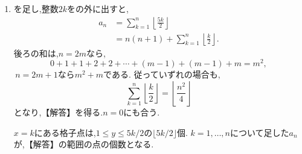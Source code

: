     \noindent {}\par\nobreak
    \begin{enumerate}[label=(\arabic*),parsep=3pt,beginpenalty=10000,format=\bookitemlink{example-gauss-role-10}{solution}{problem}]
      \item {}を足し,整数$2k$をの外に出すと,
            \begin{align*}
              a_n&=\sum_{k=1}^{n}\left\lfloor\frac{5k}{2}\right\rfloor\\
                 &=n(n+1)+\sum_{k=1}^{n}\left\lfloor\frac k2\right\rfloor.
            \end{align*}
            後ろの和は,$n=2m$なら,
            \[
              0+1+1+2+2+\cdots+(m-1)+(m-1)+m=m^2,
            \]
            \,$n=2m+1$なら$m^2+m$である.
            従っていずれの場合も,
            \[
              \sum_{k=1}^{n}\left\lfloor\frac k2\right\rfloor
              =\left\lfloor\frac{n^2}{4}\right\rfloor
            \]
            となり,【解答】を得る.$n=0$にも合う.

            $x=k$にある格子点は,$1\le y\le5k/2$の$\lfloor5k/2\rfloor$個.
            $k=1,\ldots,n$について足した$a_n$が,【解答】の範囲の点の個数となる.
    \end{enumerate}

